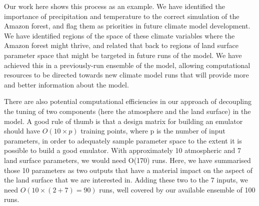 \documentclass[gmd, manuscript]{copernicus}
\begin{document}
Our work here shows this process as an example. We have identified the importance of precipitation and temperature to the correct simulation of the Amazon forest, and flag them as priorities in future climate model development. We have identified regions of the space of these climate variables where the Amazon forest might thrive, and related that back to regions of land surface parameter space that might be targeted in future runs of the model. We have achieved this in a previously-run ensemble of the model, allowing computational resources to be directed towards new climate model runs that will provide more and better information about the model.

There are also potential computational efficiencies in our approach of decoupling the tuning of two components (here the atmosphere and the land surface) in the model. A good rule of thumb is that a design matrix for building an emulator should have $O(10 \times p)$ training points, where p is the number of input parameters, in order to adequately sample parameter space to the extent it is possible to build a good emulator. With approximately 10 atmospheric and 7 land surface parameters, we would need O(170) runs. Here, we have summarised those 10 parameters as two outputs that have a material impact on the aspect of the land surface that we are interested in. Adding these two to the 7 inputs, we need $O(10 \times (2+7) = 90)$ runs, well covered by our available ensemble of 100 runs. 
\end{document}
